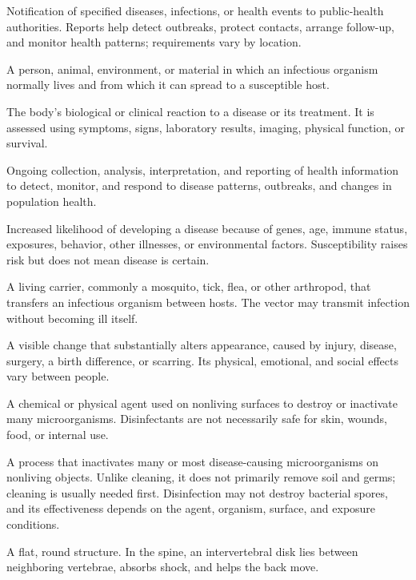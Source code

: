  Notification of specified diseases, infections, or health events to public-health authorities. Reports help detect outbreaks, protect contacts, arrange follow-up, and monitor health patterns; requirements vary by location.

 A person, animal, environment, or material in which an infectious organism normally lives and from which it can spread to a susceptible host.

 The body’s biological or clinical reaction to a disease or its treatment. It is assessed using symptoms, signs, laboratory results, imaging, physical function, or survival.

 Ongoing collection, analysis, interpretation, and reporting of health information to detect, monitor, and respond to disease patterns, outbreaks, and changes in population health.

 Increased likelihood of developing a disease because of genes, age, immune status, exposures, behavior, other illnesses, or environmental factors. Susceptibility raises risk but does not mean disease is certain.

 A living carrier, commonly a mosquito, tick, flea, or other arthropod, that transfers an infectious organism between hosts. The vector may transmit infection without becoming ill itself.

 A visible change that substantially alters appearance, caused by injury, disease, surgery, a birth difference, or scarring. Its physical, emotional, and social effects vary between people.

 A chemical or physical agent used on nonliving surfaces to destroy or inactivate many microorganisms. Disinfectants are not necessarily safe for skin, wounds, food, or internal use.

 A process that inactivates many or most disease-causing microorganisms on nonliving objects.
Unlike cleaning, it does not primarily remove soil and germs; cleaning is usually needed first.
Disinfection may not destroy bacterial spores, and its effectiveness depends on the agent,
organism, surface, and exposure conditions.

 A flat, round structure. In the spine, an intervertebral disk lies between neighboring vertebrae, absorbs shock, and helps the back move.


